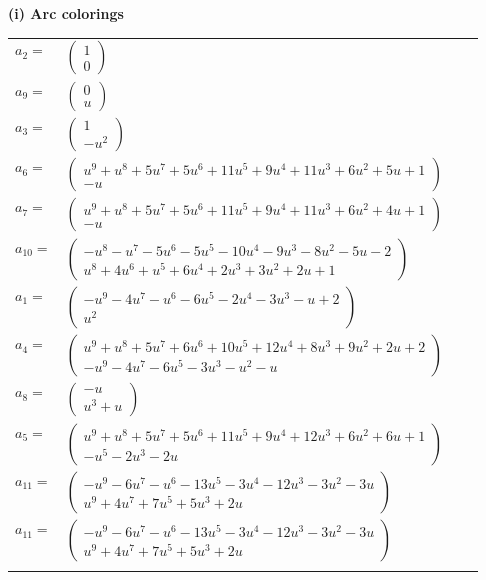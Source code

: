\documentclass[1p]{elsarticle_modified}
\theoremstyle{definition}
\begin{document}
\flushleft \textbf{(i) Arc colorings}\\
\begin{tabular}{m{7pt} m{180pt} m{7pt} m{180pt} }
\flushright $a_{2}=$&$\begin{pmatrix}1\\0\end{pmatrix}$ \\
\flushright $a_{9}=$&$\begin{pmatrix}0\\u\end{pmatrix}$ \\
\flushright $a_{3}=$&$\begin{pmatrix}1\\- u^2\end{pmatrix}$ \\
\flushright $a_{6}=$&$\begin{pmatrix}u^9+u^8+5 u^7+5 u^6+11 u^5+9 u^4+11 u^3+6 u^2+5 u+1\\- u\end{pmatrix}$ \\
\flushright $a_{7}=$&$\begin{pmatrix}u^9+u^8+5 u^7+5 u^6+11 u^5+9 u^4+11 u^3+6 u^2+4 u+1\\- u\end{pmatrix}$ \\
\flushright $a_{10}=$&$\begin{pmatrix}- u^8- u^7-5 u^6-5 u^5-10 u^4-9 u^3-8 u^2-5 u-2\\u^8+4 u^6+u^5+6 u^4+2 u^3+3 u^2+2 u+1\end{pmatrix}$ \\
\flushright $a_{1}=$&$\begin{pmatrix}- u^9-4 u^7- u^6-6 u^5-2 u^4-3 u^3- u+2\\u^2\end{pmatrix}$ \\
\flushright $a_{4}=$&$\begin{pmatrix}u^9+u^8+5 u^7+6 u^6+10 u^5+12 u^4+8 u^3+9 u^2+2 u+2\\- u^9-4 u^7-6 u^5-3 u^3- u^2- u\end{pmatrix}$ \\
\flushright $a_{8}=$&$\begin{pmatrix}- u\\u^3+u\end{pmatrix}$ \\
\flushright $a_{5}=$&$\begin{pmatrix}u^9+u^8+5 u^7+5 u^6+11 u^5+9 u^4+12 u^3+6 u^2+6 u+1\\- u^5-2 u^3-2 u\end{pmatrix}$ \\
\flushright $a_{11}=$&$\begin{pmatrix}- u^9-6 u^7- u^6-13 u^5-3 u^4-12 u^3-3 u^2-3 u\\u^9+4 u^7+7 u^5+5 u^3+2 u\end{pmatrix}$\\ \flushright $a_{11}=$&$\begin{pmatrix}- u^9-6 u^7- u^6-13 u^5-3 u^4-12 u^3-3 u^2-3 u\\u^9+4 u^7+7 u^5+5 u^3+2 u\end{pmatrix}$\\&\end{tabular}
\end{document}
